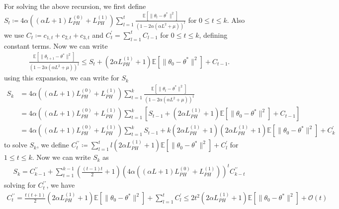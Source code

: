 \documentclass[a4paper]{article}
\newcommand{\norm}[1]{\|#1 \|}
\newcommand{\Exs}{\mathbb{E}}
\newcommand{\thetastar}{\theta^*}
\newcommand{\constLPH}[1]{L_{PH}^{(#1)}}
\newcommand{\stepsize}{\alpha}
\begin{document}
\pagebreak

For solving the above recursion, we first define $S_{t} \coloneq 4\stepsize\left(\left(\stepsize L + 1\right)\constLPH{0} + \constLPH{1}\right)\sum_{l = 1}^{t}\frac{\Exs\left[\norm{\theta_{l} - \thetastar}^{2}\right]}{\left(1 - 2\stepsize\left(\stepsize L^{2} + \mu\right)\right)^{l}}$ for $0 \le t \le k$. Also we use $C_{t} \coloneq c_{1, t} + c_{2, t} + c_{3, t}$ and $C^{\prime}_{t} = \sum_{l = 1}^{t}C_{l - 1}$ for $0 \le t \le k$, defining constant terms. Now we can write
\begin{align*}
	\frac{\Exs\left[\norm{\theta_{t + 1} - \thetastar}^{2}\right]}{\left(1 - 2\stepsize\left(\stepsize L^{2} + \mu\right)\right)^{t}} \le S_{t} + \left(2\stepsize\constLPH{1} + 1\right)\Exs\left[\norm{\theta_{0} - \thetastar}^{2}\right] +‌ C_{t - 1}.‌
\end{align*}
using this expansion, we can write for $S_{k}$
\begin{align*}
	S_{k} & = 4\stepsize\left(\left(\stepsize L + 1\right)\constLPH{0} + \constLPH{1}\right)\sum_{t = 1}^{k}\frac{\Exs\left[\norm{\theta_{t} - \thetastar}^{2}\right]}{\left(1 - 2\stepsize\left(\stepsize L^{2} + \mu\right)\right)^{t}} \\
	& = 4\stepsize\left(\left(\stepsize L + 1\right)\constLPH{0} + \constLPH{1}\right)\sum_{t = 1}^{k}\left[S_{t - 1} + \left(2\stepsize\constLPH{1} + 1\right)\Exs\left[\norm{\theta_{0} - \thetastar}^{2}\right] + C_{t - 1}\right]\\
	& = 4\stepsize\left(\left(\stepsize L + 1\right)\constLPH{0} + \constLPH{1}\right)\sum_{t = 1}^{k}S_{t - 1} + k\left(2\stepsize\constLPH{1} + 1\right)\left(2\stepsize\constLPH{1} + 1\right)\Exs\left[\norm{\theta_{0} - \thetastar}^{2}\right] + C^{\prime}_{k}
\end{align*}
to solve $S_{k}$, we define $C^{\prime\prime}_{t} \coloneq \sum_{l = 1}^{t} l\left(2\stepsize\constLPH{1} + 1\right)\Exs\left[\norm{\theta_{0} - \thetastar}^{2}\right] + C^{\prime}_{l}$ for $1 \le t \le k$. Now we can write $S_{k}$ as
\begin{align*}
	S_{k} = C^{\prime\prime}_{k - 1} + \sum_{t = 1}^{k - 1}\left(\frac{\left(t - 1\right)t}{2} + 1\right)\left(4\stepsize\left(\left(\stepsize L + 1\right)\constLPH{0} + \constLPH{1}\right)\right)^{t}C^{\prime\prime}_{k - t}
\end{align*}
solving for $C^{\prime\prime}_{t}$, we have
\begin{align*}
	C^{\prime\prime}_{t} = \frac{t\left(t + 1\right)}{2}\left(2\stepsize\constLPH{1} + 1\right)\Exs\left[\norm{\theta_{0} - \thetastar}^{2}\right] + \sum_{l = 1}^{t}C^{\prime}_{l} \le 2t^{2}\left(2\stepsize\constLPH{1} + 1\right)\Exs\left[\norm{\theta_{0} - \thetastar}^{2}\right] + \mathcal{O}\left(t\right)
\end{align*}
\end{document}
